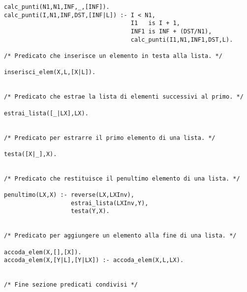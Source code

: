 \begin{verbatim}
calc_punti(N1,N1,INF,_,[INF]).
calc_punti(I,N1,INF,DST,[INF|L]) :- I < N1,
                                    I1   is I + 1,
                                    INF1 is INF + (DST/N1),
                                    calc_punti(I1,N1,INF1,DST,L).

/* Predicato che inserisce un elemento in testa alla lista. */

inserisci_elem(X,L,[X|L]).


/* Predicato che estrae la lista di elementi successivi al primo. */

estrai_lista([_|LX],LX).


/* Predicato per estrarre il primo elemento di una lista. */

testa([X|_],X).


/* Predicato che restituisce il penultimo elemento di una lista. */

penultimo(LX,X) :- reverse(LX,LXInv),
                   estrai_lista(LXInv,Y),
                   testa(Y,X).


/* Predicato per aggiungere un elemento alla fine di una lista. */

accoda_elem(X,[],[X]).
accoda_elem(X,[Y|L],[Y|LX]) :- accoda_elem(X,L,LX).


/* Fine sezione predicati condivisi */

\end{verbatim}
